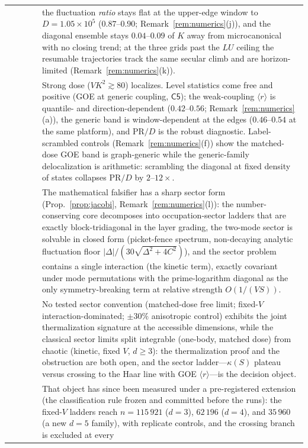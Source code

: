 \documentclass[11pt,a4paper]{article}
\theoremstyle{plain}
\theoremstyle{definition}
\theoremstyle{remark}
\begin{document}
\begin{longtable}{@{}p{}p{}p{}p{}p{}@{}}
 & & & & the fluctuation \emph{ratio} stays flat at the
upper-edge window to $D=1.05\times10^{5}$ ($0.87$--$0.90$; Remark~\ref{rem:numerics}(j)),
and the
diagonal ensemble stays $0.04$--$0.09$ of $K$ away from microcanonical
with no closing trend; at the three grids past the $LU$ ceiling the resumable
trajectories track the same secular climb and are horizon-limited
(Remark~\ref{rem:numerics}(k)).\\
 & & & & Strong dose ($VK^{2}\gtrsim80$) localizes. Level
statistics come free and positive (GOE at generic coupling, $\mathsf{C5}$); the
weak-coupling $\langle r\rangle$ is quantile- and direction-dependent
($0.42$--$0.56$; Remark~\ref{rem:numerics}(a)), the generic band is window-dependent at
the edges ($0.46$--$0.54$ at the same platform), and $\mathrm{PR}/D$ is the robust
diagnostic. Label-scrambled controls (Remark~\ref{rem:numerics}(f)) show the matched-dose
GOE band is graph-generic while the generic-family delocalization is arithmetic:
scrambling the diagonal at fixed density of states collapses $\mathrm{PR}/D$ by
$2$--$12\times$.\\
 & & & & The mathematical falsifier has a sharp sector form
(Prop.~\ref{prop:jacobi}, Remark~\ref{rem:numerics}(l)): the number-conserving
core decomposes into occupation-sector ladders that are exactly
block-tridiagonal in the layer grading, the two-mode sector is solvable in
closed form (picket-fence spectrum, non-decaying analytic fluctuation floor
$|\Delta|/(30\sqrt{\Delta^{2}+4C^{2}})$), and the sector problem contains a
single interaction (the kinetic term), exactly covariant under mode
permutations with the prime-logarithm diagonal as the only symmetry-breaking
term at relative strength $O(1/(VS))$.\\
 & & & & No tested sector convention
(matched-dose free limit; fixed-$V$ interaction-dominated; $\pm30\%$
anisotropic control) exhibits the joint thermalization signature at the
accessible dimensions, while the classical sector limits split integrable
(one-body, matched dose) from chaotic (kinetic, fixed $V$, $d\ge3$): the
thermalization proof and the obstruction are both open, and the sector
ladder---$\kappa(S)$ plateau versus crossing to the Haar line with GOE
$\langle r\rangle$---is the decision object.\\
 & & & & That object has since been
measured under a pre-registered extension (the classification rule frozen
and committed before the runs): the fixed-$V$ ladders reach $n=115\,921$
($d=3$), $62\,196$ ($d=4$), and $35\,960$ (a new $d=5$ family), with
replicate controls, and the crossing branch is excluded at every

\end{longtable}
\end{document}
